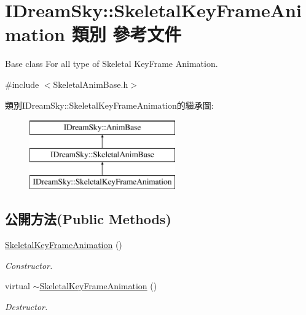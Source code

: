 \hypertarget{class_i_dream_sky_1_1_skeletal_key_frame_animation}{}\section{I\+Dream\+Sky\+:\+:Skeletal\+Key\+Frame\+Animation 類別 參考文件}
\label{class_i_dream_sky_1_1_skeletal_key_frame_animation}


Base class For all type of Skeletal Key\+Frame Animation.  




{\ttfamily \#include $<$Skeletal\+Anim\+Base.\+h$>$}

類別\+I\+Dream\+Sky\+:\+:Skeletal\+Key\+Frame\+Animation的繼承圖\+:\begin{figure}[H]
\begin{center}
\leavevmode
\includegraphics[height=3.000000cm]{class_i_dream_sky_1_1_skeletal_key_frame_animation}
\end{center}
\end{figure}
\subsection*{公開方法(Public Methods)}
\begin{DoxyCompactItemize}
\item 
\hyperlink{class_i_dream_sky_1_1_skeletal_key_frame_animation_a0a465e63e03a4d083a731f3d9e6fab8d}{Skeletal\+Key\+Frame\+Animation} ()\hypertarget{class_i_dream_sky_1_1_skeletal_key_frame_animation_a0a465e63e03a4d083a731f3d9e6fab8d}{}\label{class_i_dream_sky_1_1_skeletal_key_frame_animation_a0a465e63e03a4d083a731f3d9e6fab8d}

\begin{DoxyCompactList}\small\item\em Constructor. \end{DoxyCompactList}\item 
virtual \hyperlink{class_i_dream_sky_1_1_skeletal_key_frame_animation_a32d31e10e6cdab924d5252d9ab86a26e}{$\sim$\+Skeletal\+Key\+Frame\+Animation} ()\hypertarget{class_i_dream_sky_1_1_skeletal_key_frame_animation_a32d31e10e6cdab924d5252d9ab86a26e}{}\label{class_i_dream_sky_1_1_skeletal_key_frame_animation_a32d31e10e6cdab924d5252d9ab86a26e}

\begin{DoxyCompactList}\small\item\em Destructor. \end{DoxyCompactList}\end{DoxyCompactItemize}
